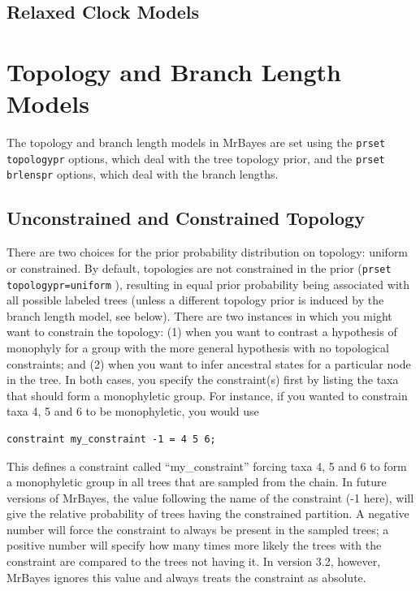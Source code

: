 \documentclass[12pt]{book}
\newcommand{\ttt}[1]{\texttt{#1} }
\begin{document}
\subsection{Relaxed Clock Models}

\section{Topology and Branch Length Models}
The topology and branch length models in MrBayes are set using the \ttt{prset topologypr} options,
which deal with the tree topology prior, and the \ttt{prset brlenspr} options, which deal with the
branch lengths.

\subsection{Unconstrained and Constrained Topology}
There are two choices for the prior probability distribution on topology: uniform or constrained.
By default, topologies are not constrained in the prior (\ttt{prset topologypr=uniform}), resulting
in equal prior probability being associated with all possible labeled trees (unless a different
topology prior is induced by the branch length model, see below). There are two instances in which
you might want to constrain the topology: (1) when you want to contrast a hypothesis of monophyly
for a group with the more general hypothesis with no topological constraints; and (2) when you want
to infer ancestral states for a particular node in the tree. In both cases, you specify the
constraint(s) first by listing the taxa that should form a monophyletic group. For instance, if you
wanted to constrain taxa 4, 5 and 6 to be monophyletic, you would use

\begin{singlespacing}
\small
\begin{verbatim}
constraint my_constraint -1 = 4 5 6;
\end{verbatim}
\normalsize
\end{singlespacing}

This defines a constraint called ``my\_constraint'' forcing taxa 4, 5 and 6 to form a monophyletic
group in all trees that are sampled from the chain. In future versions of MrBayes, the value
following the name of the constraint (-1 here), will give the relative probability of trees having
the constrained partition. A negative number will force the constraint to always be present in the
sampled trees; a positive number will specify how many times more likely the trees with the
constraint are compared to the trees not having it. In version 3.2, however, MrBayes ignores this
value and always treats the constraint as absolute.
\end{document}

